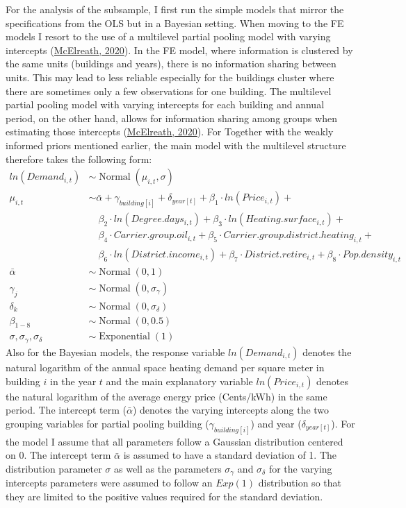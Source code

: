 \documentclass[12pt,twoside]{reedthesis}
\begin{document}
For the analysis of the subsample, I first run the simple models that mirror the specifications from the OLS but in a Bayesian setting. When moving to the FE models I resort to the use of a multilevel partial pooling model with varying intercepts (\protect\hyperlink{ref-mcelreath20}{McElreath, 2020}). In the FE model, where information is clustered by the same units (buildings and years), there is no information sharing between units. This may lead to less reliable especially for the buildings cluster where there are sometimes only a few observations for one building. The multilevel partial pooling model with varying intercepts for each building and annual period, on the other hand, allows for information sharing among groups when estimating those intercepts (\protect\hyperlink{ref-mcelreath20}{McElreath, 2020}). For Together with the weakly informed priors mentioned earlier, the main model with the multilevel structure therefore takes the following form:
\begin{align*}
ln(Demand_{i,t}) & \sim \operatorname{Normal}(\mu_{i,t}, \sigma) \\
\mu_{i,t} & \sim \bar\alpha + \gamma_{building[i]} + \delta_{year[t]} + \beta_1 \cdot ln(Price_{i,t}) +  \\
 & \quad \beta_{2} \cdot ln(Degree.days_{i,t}) + \beta_{3} \cdot ln(Heating.surface_{i,t}) + \\
 & \quad \beta_{4} \cdot Carrier.group.oil_{i,t} + \beta_{5} \cdot Carrier.group.district.heating_{i,t} + \\
 & \quad \beta_{6} \cdot ln(District.income_{i,t}) + \beta_{7} \cdot District.retire_{i,t} + \beta_{8} \cdot Pop.density_{i,t} \\
\bar\alpha & \sim \operatorname{Normal}(0, 1) \\
\gamma_j & \sim \operatorname{Normal}(0, \sigma_{\gamma}) \\
\delta_k & \sim \operatorname{Normal}(0, \sigma_{\delta}) \\
\beta_{1-8} & \sim \operatorname{Normal}(0, 0.5) \\
\sigma, \sigma_{\gamma}, \sigma_{\delta} & \sim \operatorname{Exponential}(1)
\end{align*}
Also for the Bayesian models, the response variable \(ln(Demand_{i,t})\) denotes the natural logarithm of the annual space heating demand per square meter in building \(i\) in the year \(t\) and the main explanatory variable \(ln(Price_{i,t})\) denotes the natural logarithm of the average energy price (Cents/kWh) in the same period. The intercept term (\(\bar \alpha\)) denotes the varying intercepts along the two grouping variables for partial pooling building (\(\gamma_{building[i]}\)) and year (\(\delta_{year[t]}\)). For the model I assume that all parameters follow a Gaussian distribution centered on 0. The intercept term \(\bar \alpha\) is assumed to have a standard deviation of 1. The distribution parameter \(\sigma\) as well as the parameters \(\sigma_{\gamma}\) and \(\sigma_{\delta}\) for the varying intercepts parameters were assumed to follow an \(Exp(1)\) distribution so that they are limited to the positive values required for the standard deviation.
\end{document}
